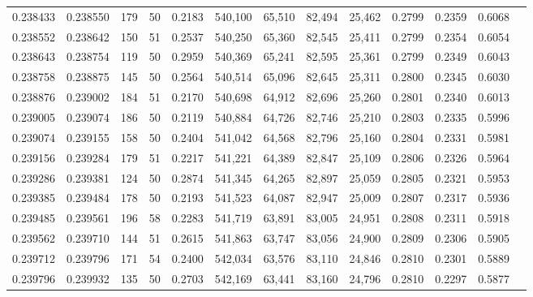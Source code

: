 \begin{tabular}{rrrrrrrrrrrrr}
0.238433 & 0.238550 &   179 &  50 &                                     0.2183 & 540,100 &  65,510 &  82,494 &  25,462 & 0.2799 & 0.2359 & 0.6068 \\
0.238552 & 0.238642 &   150 &  51 &                                     0.2537 & 540,250 &  65,360 &  82,545 &  25,411 & 0.2799 & 0.2354 & 0.6054 \\
0.238643 & 0.238754 &   119 &  50 &                                     0.2959 & 540,369 &  65,241 &  82,595 &  25,361 & 0.2799 & 0.2349 & 0.6043 \\
0.238758 & 0.238875 &   145 &  50 &                                     0.2564 & 540,514 &  65,096 &  82,645 &  25,311 & 0.2800 & 0.2345 & 0.6030 \\
0.238876 & 0.239002 &   184 &  51 &                                     0.2170 & 540,698 &  64,912 &  82,696 &  25,260 & 0.2801 & 0.2340 & 0.6013 \\
0.239005 & 0.239074 &   186 &  50 &                                     0.2119 & 540,884 &  64,726 &  82,746 &  25,210 & 0.2803 & 0.2335 & 0.5996 \\
0.239074 & 0.239155 &   158 &  50 &                                     0.2404 & 541,042 &  64,568 &  82,796 &  25,160 & 0.2804 & 0.2331 & 0.5981 \\
0.239156 & 0.239284 &   179 &  51 &                                     0.2217 & 541,221 &  64,389 &  82,847 &  25,109 & 0.2806 & 0.2326 & 0.5964 \\
0.239286 & 0.239381 &   124 &  50 &                                     0.2874 & 541,345 &  64,265 &  82,897 &  25,059 & 0.2805 & 0.2321 & 0.5953 \\
0.239385 & 0.239484 &   178 &  50 &                                     0.2193 & 541,523 &  64,087 &  82,947 &  25,009 & 0.2807 & 0.2317 & 0.5936 \\
0.239485 & 0.239561 &   196 &  58 &                                     0.2283 & 541,719 &  63,891 &  83,005 &  24,951 & 0.2808 & 0.2311 & 0.5918 \\
0.239562 & 0.239710 &   144 &  51 &                                     0.2615 & 541,863 &  63,747 &  83,056 &  24,900 & 0.2809 & 0.2306 & 0.5905 \\
0.239712 & 0.239796 &   171 &  54 &                                     0.2400 & 542,034 &  63,576 &  83,110 &  24,846 & 0.2810 & 0.2301 & 0.5889 \\
0.239796 & 0.239932 &   135 &  50 &                                     0.2703 & 542,169 &  63,441 &  83,160 &  24,796 & 0.2810 & 0.2297 & 0.5877 \\

\end{tabular}

